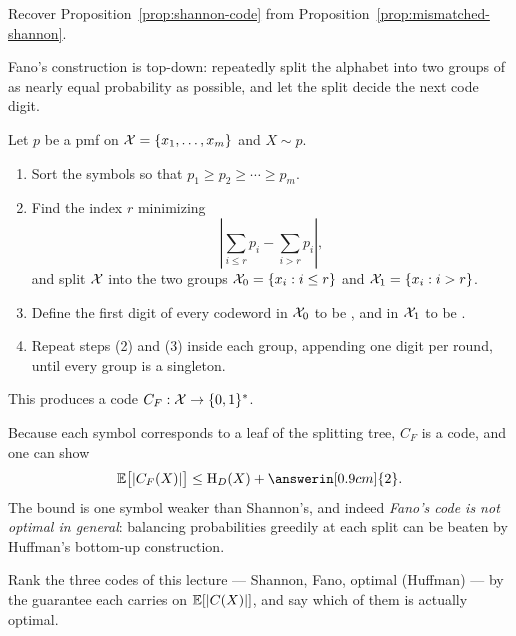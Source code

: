 \begin{yourturn}
Recover Proposition~\ref{prop:shannon-code} from
Proposition~\ref{prop:mismatched-shannon}.
\ifshowanswers\else\workspace[1]\fi
{}
\end{yourturn}


Fano's construction is top-down: repeatedly split the alphabet into two groups
of as nearly equal probability as possible, and let the split decide the next
code digit.

\begin{definition}\label{def:fano-code}
Let $p$ be a pmf on $\mathcal{X}=\{x_1,\ldots,x_m\}$ and $X\sim p$.
\begin{enumerate}
  \item Sort the symbols so that $p_1\ge p_2\ge\cdots\ge p_m$.
  \item Find the index $r$ minimizing
  \[
    \left|\sum_{i\le r}p_i-\sum_{i>r}p_i\right|,
  \]
  and split $\mathcal{X}$ into the two groups
  $\mathcal{X}_0=\{x_i:i\le r\}$ and $\mathcal{X}_1=\{x_i:i>r\}$.
  \item Define the first digit of every codeword in $\mathcal{X}_0$ to be
  , and in $\mathcal{X}_1$ to be .
  \item Repeat steps (2) and (3) inside each group, appending one digit per
  round, until every group is a singleton.
\end{enumerate}
This produces a code $C_F:\mathcal{X}\to\{0,1\}^*$.
\end{definition}

Because each symbol corresponds to a leaf of the splitting tree, $C_F$ is a
 code, and one can show
\[
  \E\bigl[|C_F(X)|\bigr]\le\Ent_D(X)+\answerin[0.9cm]{2}.
\]
The bound is one symbol weaker than Shannon's, and indeed \emph{Fano's code is
not optimal in general}: balancing probabilities greedily at each split can be
beaten by Huffman's bottom-up construction.

\begin{yourturn}
Rank the three codes of this lecture --- Shannon, Fano, optimal (Huffman) --- by
the guarantee each carries on $\mathbb{E}[|C(X)|]$, and say which of them is actually
optimal.
\ifshowanswers\else\workspace[3]\fi
{}
\end{yourturn}

\vspace{0.8cm}
